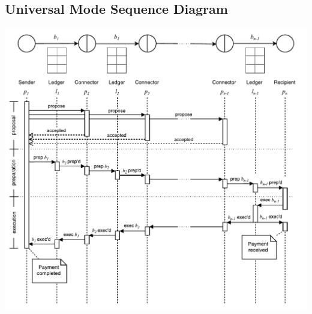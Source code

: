\documentclass[letterpaper,twocolumn,10pt]{article}
\begin{document}
\clearpage

\subsection{Universal Mode Sequence Diagram}
\label{sec:Universal-sequence}

\begin{minipage}{\textwidth}
    \centering
    \includegraphics[width=\textwidth]{figures/universal-sequence.pdf}
\end{minipage}







\end{document}
